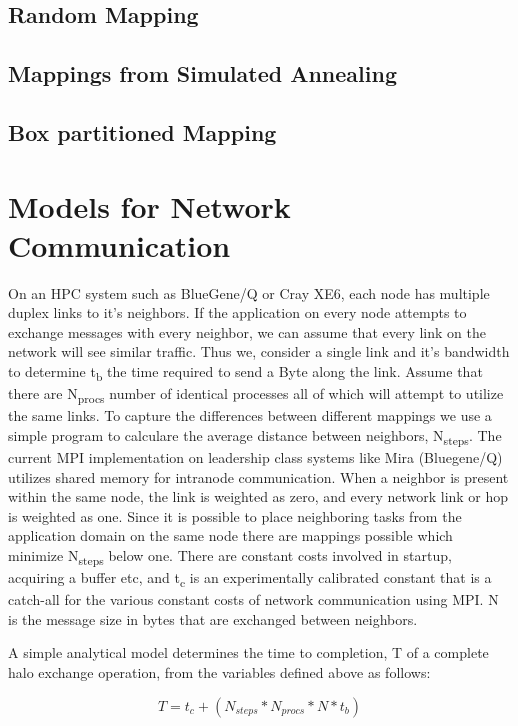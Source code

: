 \documentclass[conference,10pt]{IEEEtran}
\begin{document}
\subsection{Random Mapping}
\subsection{Mappings from Simulated Annealing}

\subsection{Box partitioned Mapping }


\section{Models for Network Communication}

On an HPC system such as BlueGene/Q or Cray XE6, each node has multiple duplex links to it's neighbors.
If the application on every node attempts to exchange messages with every neighbor, we can assume that
every link on the network will see similar traffic. Thus we, consider a single link and it's bandwidth
to determine t\textsubscript{b} the time required to send a Byte along the link. Assume that there are N\textsubscript{procs} number
of identical processes all of which will attempt to utilize the same links. To capture the differences
between different mappings we use a simple program to calculare the average distance between neighbors,
N\textsubscript{steps}. The current MPI implementation on leadership class systems like Mira (Bluegene/Q) utilizes
shared memory for intranode communication. When a neighbor is present within the same node, the link
is weighted as zero, and every network link or hop is weighted as one. Since it is possible to place
neighboring tasks from the application domain on the same node there are mappings possible which
minimize N\textsubscript{steps} below one. There are constant costs involved in startup, acquiring a buffer etc,
and t\textsubscript{c} is an experimentally calibrated constant that is a catch-all for the various constant costs
of network communication using MPI. N is the message size in bytes that are exchanged between neighbors.

A simple analytical model determines the time to completion, T of a complete halo exchange operation,
from the variables defined above as follows:

\begin{equation}
  T = t_c + (N_{steps} * N_{procs} * N * t_b)
\end{equation}
\end{document}
